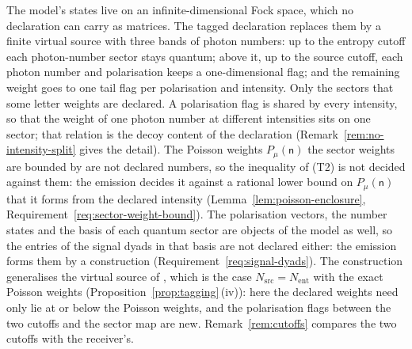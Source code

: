 The model's states live on an infinite-dimensional Fock space, which no
declaration can carry as matrices. The tagged declaration replaces them by a
finite virtual source with three bands of photon numbers: up to the entropy
cutoff each photon-number sector stays quantum; above it, up to the source
cutoff, each photon number and polarisation keeps a one-dimensional flag; and
the remaining weight goes to one tail flag per polarisation and intensity. Only
the sectors that some letter weights are declared. A polarisation flag is
shared by every intensity, so that the weight of one photon number at different
intensities sits on one sector; that relation is the decoy content of the
declaration (Remark~\ref{rem:no-intensity-split} gives the detail). The
Poisson weights $P_\mu(\mathsf{n})$ the sector weights are bounded by are not
declared numbers, so the inequality of (T2) is not decided against them: the
emission decides it against a rational lower bound on $P_\mu(\mathsf{n})$
that it forms from the declared intensity
(Lemma~\ref{lem:poisson-enclosure}, Requirement~\ref{req:sector-weight-bound}).
The polarisation vectors, the number states and the basis of each quantum
sector are objects of the model as well, so the entries of the signal dyads in
that basis are not declared either: the emission forms them by a construction
(Requirement~\ref{req:signal-dyads}). The
construction generalises the virtual source of
\cite[Eq.~(145)]{tupkary2026decoy}, which is the case
$N_{\mathrm{src}}=N_{\mathrm{ent}}$ with the exact Poisson weights
(Proposition~\ref{prop:tagging}\,(iv)): here the declared weights need only lie
at or below the Poisson weights, and the polarisation flags between the two
cutoffs and the sector map are new. Remark~\ref{rem:cutoffs} compares the two
cutoffs with the receiver's.

